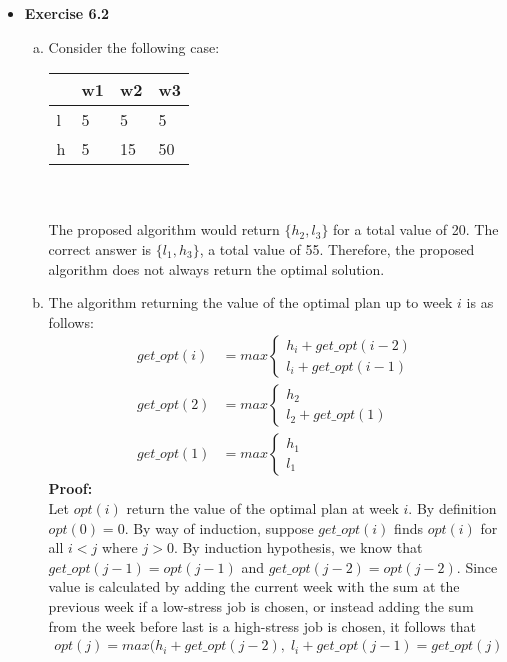 \documentclass[a4paper]{article}
\begin{document}
\begin{itemize}
\item{\textbf{Exercise 6.2}}
\begin{enumerate}[a.]
 \item Consider the following case: \\
 \begin{tabular}{l | l l l}
 & w1 & w2 & w3 \\
 \hline
 l & 5 & 5 & 5 \\
 h & 5 & 15 & 50 \\
 \end{tabular} \\ \\
 The proposed algorithm would return $\{h_2, l_3\}$ for a total value of 20. The correct answer is $\{l_1, h_3\}$, a total value of 55. Therefore, the proposed algorithm does not always return the optimal solution.
 \item The algorithm returning the value of the optimal plan up to week $i$ is as follows:
\begin{align*}
 get\_opt(i) &= max
  \begin{cases}
   h_i + get\_opt(i-2) \\
   l_i + get\_opt(i-1)
  \end{cases} \\
 get\_opt(2) &= max
  \begin{cases}
   h_2 \\
   l_2 + get\_opt(1)
  \end{cases} \\
 get\_opt(1) &= max
  \begin{cases}
   h_1 \\
   l_1 
  \end{cases}
\end{align*}
\textbf{Proof:} \\
Let $opt(i)$ return the value of the optimal plan at week $i$. By definition $opt(0) = 0$. By way of induction, suppose $get\_opt(i)$ finds $opt(i)$ for all $i <j$ where $j > 0$. By induction hypothesis, we know that $get\_opt(j-1) = opt(j-1)$ and $get\_opt(j-2) = opt(j-2)$. Since value is calculated by adding the current week with the sum at the previous week if a low-stress job is chosen, or instead adding the sum from the week before last is a high-stress job is chosen, it follows that 
\begin{align*}
opt(j) = max(h_i+get\_opt(j-2), \;l_i+get\_opt(j-1) = get\_opt(j)
\end{align*}
\end{enumerate}


\end{itemize}
\end{document}
